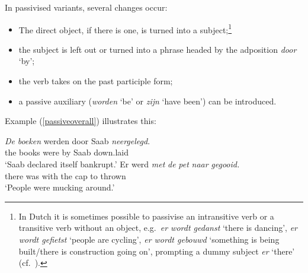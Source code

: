 \documentclass[output=paper,colorlinks,citecolor=brown]{langscibook}
\begin{document}






In  passivised variants, several changes occur:\largerpage[2]

\begin{itemize}
\item The direct object, if there is one, is turned into a subject;\footnote{In Dutch it is sometimes possible to passivise an intransitive verb or a transitive verb without an object, e.g.\ \textit{er wordt gedanst} `there is dancing', \textit{er wordt gefietst} `people are cycling', \textit{er wordt gebouwd} `something is being built/there is construction going on', prompting a dummy subject \textit{er} `there' (cf.\ \cite{tp:14406719669147366}).}
\item the subject is left out or turned into a phrase headed by the adposition \textit{door} `by';
\item the verb takes on the past participle form;
\item a passive auxiliary (\textit{worden} `be' or \textit{zijn} `have been') can be  introduced.
\end{itemize}

Example (\ref{passiveoverall}) illustrates this:

\begin{exe}
\ex\label{passiveoverall}
\begin{xlist}
\ex\label{passive} \gll \textit{De} \textit{boeken} werden door Saab \textit{neergelegd}.\\
the books were by Saab down.laid\\
\glt `Saab declared itself bankrupt.'
\ex\label{impersonalpassive} \gll Er werd \textit{met} \textit{de} \textit{pet} \textit{naar} \textit{gegooid.}\\
there was with the cap to thrown\\
\glt `People were mucking around.'
\end{xlist}
\end{exe}
\end{document}
